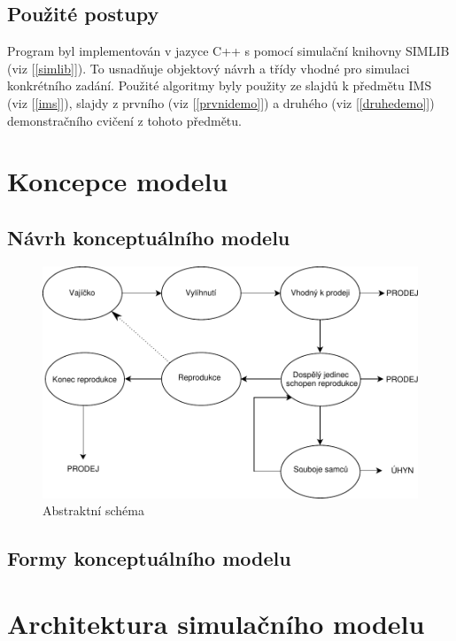 \documentclass[11pt, a4paper, titlepage]{article}
\begin{document}
    \subsection{Použité postupy}
    Program byl implementován v jazyce C++ s pomocí simulační knihovny SIMLIB (viz [\ref{simlib}]). To usnadňuje objektový návrh
    a třídy vhodné pro simulaci konkrétního zadání. Použité algoritmy byly použity ze slajdů k předmětu IMS (viz [\ref{ims}]), slajdy
    z prvního (viz [\ref{prvnidemo}]) a druhého (viz [\ref{druhedemo}]) demonstračního cvičení z tohoto předmětu.

    \section{Koncepce modelu}

    \subsection{Návrh konceptuálního modelu}

    \begin{figure}[H]
        \begin{center}
            \includegraphics[width=.8\textwidth]{./assets/abstraktni_model.pdf}
            \caption{Abstraktní schéma}
        \end{center}
    \end{figure}

    \subsection{Formy konceptuálního modelu}

    \section{Architektura simulačního modelu}
\end{document}
